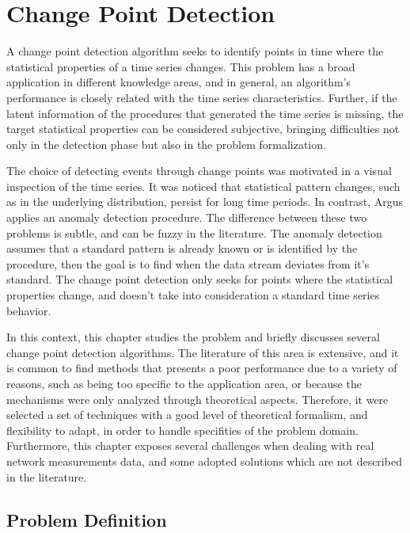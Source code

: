 \chapter{Change Point Detection}
\label{chap:change_point_detection}

A change point detection algorithm seeks to identify points in time where the
statistical properties of a time series changes. This problem has a broad
application in different knowledge areas, and in general, an algorithm's
performance is closely related with the time series characteristics.
Further, if the latent information of the procedures that generated the time
series is missing, the target statistical properties can be considered
subjective, bringing difficulties not only in the detection phase but also in
the problem formalization.

The choice of detecting events through change points was motivated in a
visual inspection of the time series.
It was noticed that statistical pattern changes, such as in the underlying
distribution, persist for long time periods.
In contrast, Argus applies an anomaly detection procedure.
The difference between
these two problems is subtle, and can be fuzzy in the literature. The
anomaly detection assumes that a standard pattern is already known or
is identified by the procedure, then the goal is to find when the data
stream
deviates from it's standard. The change point detection only seeks for
points where the statistical properties change, and doesn't take into
consideration a standard time series behavior.

In this context, this chapter studies the problem and briefly discusses
several change point detection algorithms. The literature of this area is
extensive, and it is common to find methods that presents a poor performance
due to a variety of reasons, such as being too specific to the application
area, or because the mechanisms were only analyzed through theoretical
aspects. Therefore, it were selected a set of techniques with a good level
of theoretical formalism, and flexibility to adapt, in order to handle
specifities of the problem domain. Furthermore, this chapter exposes several
challenges when dealing with real network measurements data,
and some adopted solutions which are not described in the literature.

\section{Problem Definition}

